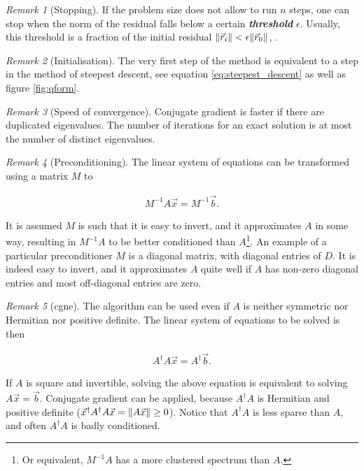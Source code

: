 \documentclass{article}
\theoremstyle{plain} %
\theoremstyle{convention} %
\theoremstyle{remark} %
\newtheorem*{remark}{Remark} %
\def\df#1{\textbf{\textit{#1}}}
\numberwithin{equation}{section}
\begin{document}
\begin{remark}[Stopping]
    If the problem size does not allow to run $n$ steps, one can stop when the norm of the residual falls below a certain \df{threshold} $\epsilon$. Usually, this threshold is a fraction of the initial residual $\norm{\vec{r}_i} < \epsilon \norm{\vec{r}_0}$, \cite{shewchuk1994}.
\end{remark}

\begin{remark}[Initialisation]
    The very first step of the method is equivalent to a step in the method of steepest descent, see equation \eqref{eq:steepest_descent} as well as figure \ref{fig:qform}.
\end{remark}

\begin{remark}[Speed of convergence]
    Conjugate gradient is faster if there are duplicated eigenvalues. The number of iterations for an exact solution is at most the number of distinct eigenvalues.
\end{remark}

\begin{remark}[Preconditioning]
    The linear system of equations can be transformed using a matrix $M$ to

    \begin{align*}
        M^{-1} A \vec{x} = M^{-1} \vec{b}.
    \end{align*}

    It is assumed $M$ is such that it is easy to invert, and it approximates $A$ in some way, resulting in $M^{-1} A$ to be better conditioned than $A$\footnote{Or equivalent, $M^{-1}A$ has a more clustered spectrum than $A$.}. An example of a particular preconditioner $M$ is a diagonal matrix, with diagonal entries of $D$. It is indeed easy to invert, and it approximates $A$ quite well if $A$ has non-zero diagonal entries and most off-diagonal entries are zero.
\end{remark}

\begin{remark}[\acrfull{cgne}]
    The algorithm can be used even if $A$ is neither symmetric nor Hermitian nor positive definite. The linear system of equations to be solved is then

    \begin{align*}
        A^{\dagger} A \vec{x} = A^{\dagger} \vec{b}.
    \end{align*}

    If $A$ is square and invertible, solving the above equation is equivalent to solving $A \vec{x} = \vec{b}$. Conjugate gradient can be applied, because $A^{\dagger} A$ is Hermitian and positive definite ($\vec{x}^{\dagger} A^{\dagger} A \vec{x} = \norm{A \vec{x}} \ge 0$). Notice that $A^{\dagger} A$ is less sparse than $A$, and often $A^{\dagger} A$ is badly conditioned.

\end{remark}
\end{document}
